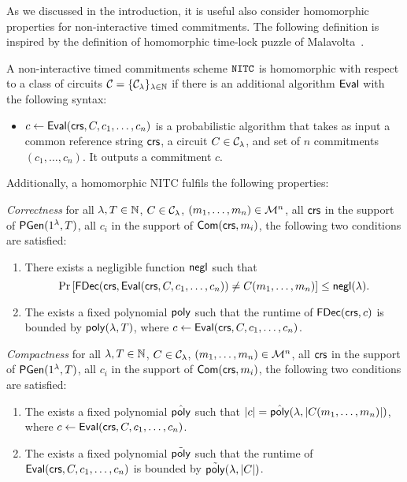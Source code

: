As we discussed in the introduction, it is useful also consider homomorphic properties for non-interactive timed commitments. The following definition is inspired by the definition of homomorphic time-lock puzzle of Malavolta~\etal \cite{C:MalThy19}. 

\begin{definition}
\label{def:nitc_hom}
A non-interactive timed commitments scheme $\mathtt{NITC}$ is homomorphic with respect to a class of circuits $\mathcal{C} = \{\mathcal{C}_{\lambda}\}_{\lambda \in \mathbb{N}}$ if there is an additional algorithm $\mathsf{Eval}$ with the following syntax:
\begin{itemize}
\item $c \leftarrow \mathsf{Eval}(\mathsf{crs}, C, c_1, \dots, c_n)$ is a probabilistic algorithm that takes as input a common reference string $\mathsf{crs}$, a circuit $C \in \mathcal{C}_{\lambda}$, and set of $n$ commitments $(c_1, \dots, c_n)$. It outputs a commitment $c$. 
\end{itemize}
Additionally, a homomorphic NITC fulfils the following properties:
\item \emph{Correctness} for all $\lambda, T \in \mathbb{N}$, $C \in \mathcal{C}_{\lambda}$, $(m_1, \dots, m_n) \in \mathcal{M}^n$, all $\mathsf{crs}$ in the support of $\mathsf{PGen}(1{^{\lambda}}, T)$, all $c_i$ in the support of $\mathsf{Com}(\mathsf{crs}, m_i)$, the following two conditions are satisfied:
\begin{enumerate}
\item There exists a negligible function $\mathsf{negl}$ such that 
\[\Pr\left[\mathsf{FDec}(\mathsf{crs}, \mathsf{Eval}(\mathsf{crs}, C, c_1, \dots, c_n)) \neq C(m_1, \dots, m_n) \right] \leq \mathsf{negl}(\lambda).
\]
\item The exists a fixed polynomial $\mathsf{poly}$ such that the runtime of $\mathsf{FDec}(\mathsf{crs}, c)$ is bounded by $\mathsf{poly}(\lambda, T)$, where $c \leftarrow \mathsf{Eval}(\mathsf{crs}, C, c_1, \dots, c_n)$.
\end{enumerate}
\item \emph{Compactness} for all $\lambda, T \in \mathbb{N}$, $C \in \mathcal{C}_{\lambda}$, $(m_1, \dots, m_n) \in \mathcal{M}^n$, all $\mathsf{crs}$ in the support of $\mathsf{PGen}(1{^{\lambda}}, T)$, all $c_i$ in the support of $\mathsf{Com}(\mathsf{crs}, m_i)$, the following two conditions are satisfied:
\begin{enumerate}
\item The exists a fixed polynomial $\hat{\mathsf{poly}}$ such that $|c|=\hat{\mathsf{poly}}(\lambda, |C(m_1, \dots, m_n)|)$, where $c \leftarrow \mathsf{Eval}(\mathsf{crs}, C, c_1, \dots, c_n)$.
\item The exists a fixed polynomial $\tilde{\mathsf{poly}}$ such that the runtime of $\mathsf{Eval}(\mathsf{crs}, C, c_1, \dots, c_n)$ is bounded by $\tilde{\mathsf{poly}}(\lambda, |C|)$.
\end{enumerate}
\end{definition}


